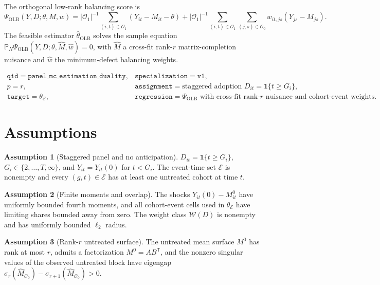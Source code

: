 \documentclass[11pt]{article}
\newcommand{\one}{\mathbf{1}}
\newcommand{\transpose}{\mathsf{T}}
\theoremstyle{definition}
\newtheorem{assumption}{Assumption}
\theoremstyle{plain}
\theoremstyle{remark}
\begin{document}
The orthogonal low-rank balancing score is
\[
\Psi_{\mathrm{OLB}}(Y,D;\theta,M,w)=
|\mathcal{O}_1|^{-1}\sum_{(i,t)\in\mathcal{O}_1}(Y_{it}-M_{it}-\theta)
+|\mathcal{O}_1|^{-1}\sum_{(i,t)\in\mathcal{O}_1}\sum_{(j,s)\in\mathcal{O}_0}w_{it,js}(Y_{js}-M_{js}).
\]
The feasible estimator \(\widehat\theta_{\mathrm{OLB}}\) solves the sample equation
\(\mathbb P_N\Psi_{\mathrm{OLB}}(Y,D;\theta,\widehat M,\widehat w)=0\), with \(\widehat M\) a cross-fit rank-\(r\) matrix-completion nuisance and \(\widehat w\) the minimum-defect balancing weights.

\[
\begin{array}{ll}
\texttt{qid}=\texttt{panel\_mc\_estimation\_duality},&
\texttt{specialization}=\texttt{v1},\\
p=r,&
\texttt{assignment}=\text{staggered adoption }D_{it}=\one\{t\ge G_i\},\\
\texttt{target}=\theta_{\mathcal{E}},&
\texttt{regression}=\Psi_{\mathrm{OLB}}\text{ with cross-fit rank-}r\text{ nuisance and cohort-event weights.}
\end{array}
\]

\section{Assumptions}
\begin{assumption}[Staggered panel and no anticipation]\label{ass:staggered}
\(D_{it}=\one\{t\ge G_i\}\), \(G_i\in\{2,\ldots,T,\infty\}\), and \(Y_{it}=Y_{it}(0)\) for \(t<G_i\).  The event-time set \(\mathcal{E}\) is nonempty and every \((g,t)\in\mathcal{E}\) has at least one untreated cohort at time \(t\).
\end{assumption}

\begin{assumption}[Finite moments and overlap]\label{ass:moments-overlap}
The shocks \(Y_{it}(0)-M^0_{it}\) have uniformly bounded fourth moments, and all cohort-event cells used in \(\theta_{\mathcal{E}}\) have limiting shares bounded away from zero.  The weight class \(\mathcal{W}(D)\) is nonempty and has uniformly bounded \(\ell_2\) radius.
\end{assumption}

\begin{assumption}[Rank-\(r\) untreated surface]\label{ass:rank}
The untreated mean surface \(M^0\) has rank at most \(r\), admits a factorization \(M^0=AB^{\transpose}\), and the nonzero singular values of the observed untreated block have eigengap \(\sigma_r(\widehat M_{\mathcal{O}_0})-\sigma_{r+1}(\widehat M_{\mathcal{O}_0})>0\).
\end{assumption}
\end{document}
